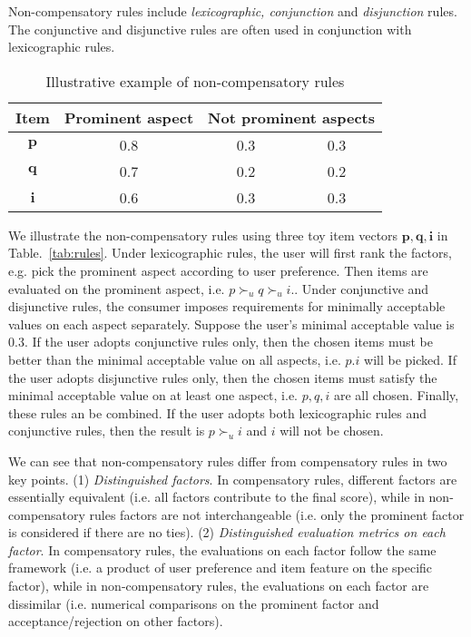 \documentclass[letterpaper]{article} %
\begin{document}
Non-compensatory rules include \textit{lexicographic, conjunction} and \textit{disjunction} rules. The conjunctive and disjunctive rules are often used in conjunction with lexicographic rules.

\begin{table}[htp]\label{tab:rules}
\caption{Illustrative example of non-compensatory rules}
\begin{center}
\begin{tabular}{|c|c|c|c|}
\hline
Item & Prominent aspect & \multicolumn{2}{|c|}{Not prominent aspects}\\\hline
$\mathbf{p}$ & 0.8 & 0.3 & 0.3  \\\hline
$\mathbf{q}$ & 0.7 & 0.2 & 0.2 \\\hline
$\mathbf{i}$ & 0.6 & 0.3 & 0.3 \\\hline
\end{tabular}
\end{center}
\label{default}
\end{table}%

We illustrate the non-compensatory rules using three toy item vectors $\mathbf{p,q,i}$  in Table.~\ref{tab:rules}. Under lexicographic rules, the user will first rank the factors, e.g. pick the prominent aspect according to user preference. Then items are evaluated on the prominent aspect, i.e. $p\succ_u q \succ_u i$.. Under conjunctive and disjunctive rules, the consumer imposes requirements for minimally acceptable values on each aspect separately.  Suppose the user's minimal acceptable value is $0.3$. If the user adopts conjunctive rules only, then the chosen items must be better than the minimal acceptable value on all aspects, i.e. $p.i$ will be  picked. If the user adopts disjunctive rules only, then the chosen items must satisfy the minimal acceptable value on at least one aspect, i.e. $p,q,i$ are all chosen. Finally, these rules an be combined. If the user adopts both lexicographic rules and conjunctive rules, then the result is $p\succ_u i$ and $i$ will not be chosen. 

We can see that non-compensatory rules differ from compensatory rules in two key points. (1) \textit{Distinguished factors}. In compensatory rules, different factors are essentially equivalent (i.e. all factors contribute to the final score), while in non-compensatory rules factors are not interchangeable (i.e. only the prominent factor is considered if there are no ties). (2) \textit{Distinguished evaluation metrics on each factor}. In compensatory rules, the evaluations on each factor follow the same framework (i.e. a product of user preference and item feature on the specific factor), while in non-compensatory rules, the evaluations on each factor are dissimilar (i.e. numerical comparisons on the prominent factor and acceptance/rejection on other factors).  
\end{document}
